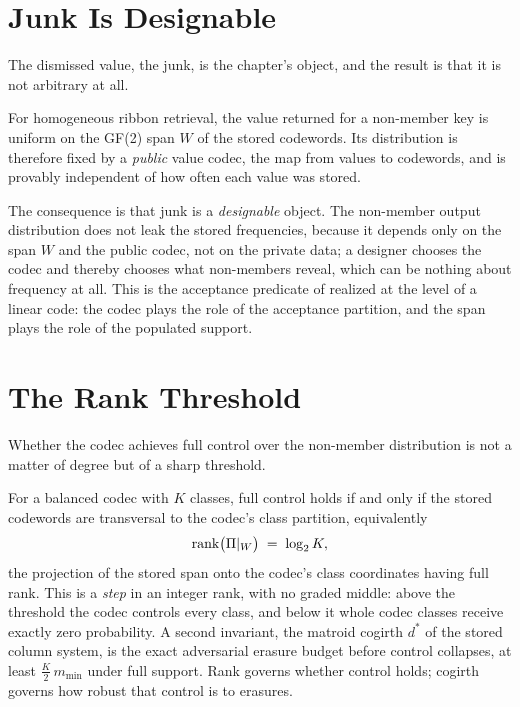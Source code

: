 \section{Junk Is Designable}
\label{sec:designable-junk}

The dismissed value, the junk, is the chapter's object, and the result is
that it is not arbitrary at all.

\begin{theorem}
\label{thm:span-output}
For homogeneous ribbon retrieval, the value returned for a non-member key is
uniform on the GF(2) span $W$ of the stored codewords. Its distribution is
therefore fixed by a \emph{public} value codec, the map from values to
codewords, and is provably independent of how often each value was stored.
\end{theorem}

The consequence is that junk is a \emph{designable} object. The non-member
output distribution does not leak the stored frequencies, because it depends
only on the span $W$ and the public codec, not on the private data; a
designer chooses the codec and thereby chooses what non-members reveal,
which can be nothing about frequency at all. This is the acceptance predicate
of  realized at the level of a linear code: the codec
plays the role of the acceptance partition, and the span plays the role of
the populated support.

\section{The Rank Threshold}
\label{sec:rank-threshold}

Whether the codec achieves full control over the non-member distribution is
not a matter of degree but of a sharp threshold.

\begin{remark}
\label{rem:rank-threshold}
For a balanced codec with $K$ classes, full control holds if and only if the
stored codewords are transversal to the codec's class partition, equivalently
\[
  \operatorname{rank}\bigl(\Pi|_{W}\bigr) \;=\; \log_2 K,
\]
the projection of the stored span onto the codec's class coordinates having
full rank. This is a \emph{step} in an integer rank, with no graded middle:
above the threshold the codec controls every class, and below it whole codec
classes receive exactly zero probability. A second invariant, the matroid
cogirth $d^{*}$ of the stored column system, is the exact adversarial erasure
budget before control collapses, at least $\tfrac{K}{2}\,m_{\min}$ under full
support. Rank governs whether control holds; cogirth governs how robust that
control is to erasures.
\end{remark}

